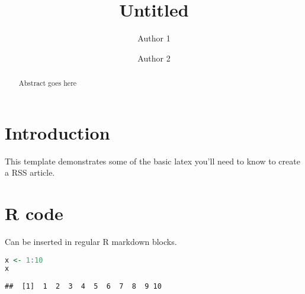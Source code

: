 \documentclass{statsoc}
\title[Untitled]{Untitled}
\author[Author 1 et. al.]{Author 1}
\author[Author 1 et. al.]{Author 2}
\begin{document}
\begin{abstract}
Abstract goes here
\end{abstract}

\section{Introduction}\label{introduction}

This template demonstrates some of the basic latex you'll need to know
to create a RSS article.

\section{R code}\label{r-code}

Can be inserted in regular R markdown blocks.

\begin{lstlisting}[language=
R
]
x <- 1:10
x
\end{lstlisting}

\begin{verbatim}
##  [1]  1  2  3  4  5  6  7  8  9 10
\end{verbatim}



\end{document}
